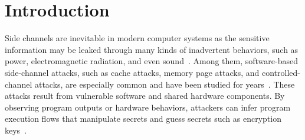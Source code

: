\section{Introduction} 
Side channels are inevitable in modern computer systems as the sensitive
information may be leaked through many kinds of inadvertent behaviors, such as power,
electromagnetic radiation, and even
sound~\cite{agrawal2002side,kar20178,chari1999towards,217605,genkin2014rsa}.
Among them, software-based side-channel attacks, such as cache attacks, memory page
attacks, and controlled-channel attacks, are especially common and have been
studied for
years~\cite{7163052,217543,217589,lee2017inferring,191010,liu2015last}. These
attacks result from vulnerable software and shared hardware components.
By observing program outputs or hardware behaviors, attackers can infer program
execution flows that manipulate secrets and guess secrets such as encryption
keys~\cite{Osvik2006,Gullasch:2011:CGB:2006077.2006784,203878,10.1007/978-3-540-45238-6_6}.


